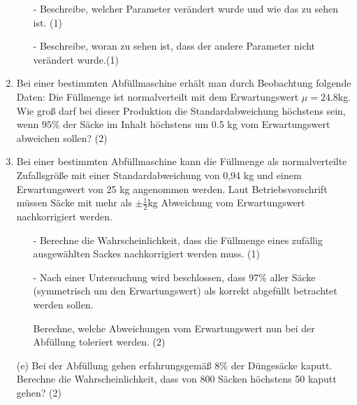 \begin{langesbeispiel}
\begin{enumerate}
\begin{enumerate}

\item[-]
Beschreibe, welcher Parameter verändert wurde und wie das zu sehen ist.
(1)
\item[-]
Beschreibe, woran zu sehen ist, dass der andere Parameter nicht verändert wurde.(1)

\end{enumerate}

\item
Bei einer bestimmten Abfüllmaschine erhält man durch Beobachtung folgende Daten: Die Füllmenge ist normalverteilt mit dem Erwartungswert $\mu=24.8$kg.
Wie groß darf bei dieser Produktion die Standardabweichung höchstens sein, wenn $95\%$ der Säcke im Inhalt höchstens um 0.5 kg vom Erwartungswert abweichen sollen? (2)




\item
Bei einer bestimmten Abfüllmaschine kann die Füllmenge als normalverteilte Zufallsgröße mit einer Standardabweichung von 0,94 kg und einem Erwartungswert von 25 kg angenommen werden.
Laut Betriebsvorschrift müssen Säcke mit mehr als $\pm \frac{1}{2}$kg Abweichung vom Erwartungswert nachkorrigiert werden.

\begin{enumerate}

\item[-]
Berechne die Wahrscheinlichkeit, dass die Füllmenge eines zufällig ausgewählten Sackes nachkorrigiert werden muss. (1)
\item[-]
Nach einer Untersuchung wird beschlossen, dass $97 \%$ aller Säcke (symmetrisch um den Erwartungswert) als korrekt abgefüllt betrachtet werden sollen.

Berechne, welche Abweichungen vom Erwartungswert nun bei der Abfüllung toleriert werden. (2)




\end{enumerate}

\item[\fbox{\LARGE A} (e)]
Bei der Abfüllung gehen erfahrungsgemäß $8\%$ der Düngesäcke kaputt.
Berechne die Wahrscheinlichkeit, dass von 800 Säcken höchstens 50 kaputt gehen? (2)


\end{enumerate}
\end{langesbeispiel}